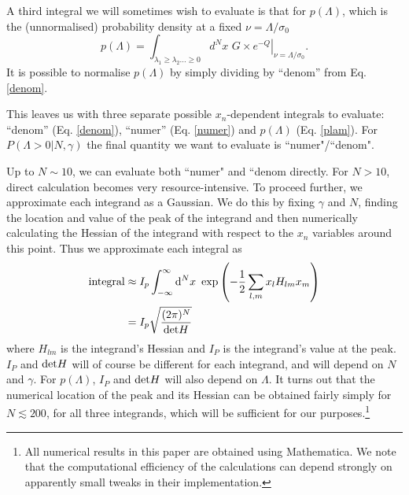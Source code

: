 \documentclass[12pt]{article}
\begin{document}
A third integral we will sometimes wish to evaluate is that for $p(\Lambda)$, which is the (unnormalised) probability density at a fixed $\nu=\Lambda/\sigma_0$
%
\begin{equation}\label{plam}
p(\Lambda) = \int_{\lambda_1 \geq \lambda_2 \ldots \geq 0}d^N x\,\, G\times \left.e^{-Q}\right|_{\nu=\Lambda/\sigma_0}.
\end{equation}
%
It is possible to normalise $p(\Lambda)$ by simply dividing by ``denom'' from Eq. \eqref{denom}.

This leaves us with three separate possible $x_n$-dependent integrals  to evaluate: ``denom'' (Eq. \ref{denom}), ``numer'' (Eq. \ref{numer}) and $p(\Lambda)$ (Eq. \ref{plam}).  For $P(\Lambda>0|N,\gamma)$ the final quantity we want to evaluate is ``numer"/``denom".

Up to $N \sim 10$, we can evaluate both ``numer" and ``denom directly. For $N>10$, direct calculation becomes very resource-intensive. To proceed further, we approximate each integrand as a Gaussian. We do this by fixing $\gamma$ and $N$, finding the location and value of the peak of the integrand and then numerically calculating the Hessian of the integrand with respect to the $x_n$ variables around this point. Thus we approximate each integral as
%
\begin{align}\label{Gauss}
\begin{split}
{\rm integral} &\approx I_p\int_{-\infty}^{\infty} {\rm d}^Nx\,\, \exp\left(-\frac{1}{2}\sum_{l,m}x_lH_{lm}x_m\right) \\
&=I_p \sqrt{\frac{(2\pi)^N}{\mathrm{det} H}}
\end{split}
\end{align}
%
\noindent where $H_{lm}$ is the integrand's Hessian and $I_P$ is the integrand's value at the peak. $I_P$ and ${\rm det}H$ will of course be different for each integrand, and will depend on $N$ and $\gamma$. For $p(\Lambda)$, $I_P$ and ${\rm det} H$ will also depend on $\Lambda$. It turns out that the numerical location of the peak and its Hessian can be obtained fairly simply for $N\lesssim 200$, for all three integrands, which will be sufficient for our purposes.\footnote{All numerical results in this paper are obtained using Mathematica. We note that the computational efficiency of the calculations can depend strongly on apparently small tweaks in their implementation.}
\end{document}
